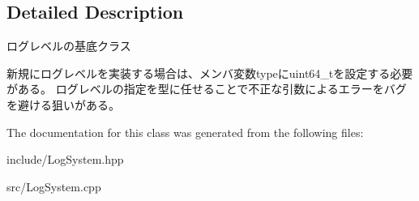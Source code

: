 \subsection{Detailed Description}
ログレベルの基底クラス 

新規にログレベルを実装する場合は、メンバ変数typeにuint64\+\_\+tを設定する必要がある。 ログレベルの指定を型に任せることで不正な引数によるエラーをバグを避ける狙いがある。 

The documentation for this class was generated from the following files\+:\begin{DoxyCompactItemize}
\item 
include/Log\+System.\+hpp\item 
src/Log\+System.\+cpp\end{DoxyCompactItemize}
